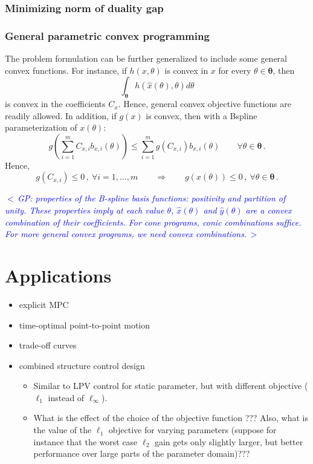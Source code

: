 \documentclass{article}
\newcommand{\commentGP}[1]{\noindent \textcolor{blue}{\emph{$<\,$GP: #1$\,>$}}}%
\newcommand{\ppar}{\theta}                          %
\newcommand{\Ppar}{{\bm{\theta}}}                   %
\begin{document}
\subsubsection{Minimizing norm of duality gap}


\subsubsection{General parametric convex programming}

The problem formulation can be further generalized to include some general convex functions. For instance, if $h(x,\ppar)$ is convex in $x$ for every $\ppar\in\Ppar$, then
\[ \int_{\Ppar} h(\hat{x}(\ppar), \ppar) d\ppar
\]
is convex in the coefficients $C_x$. Hence, general convex objective functions are readily allowed. In addition, if $g(x)$ is convex, then with a Bspline parameterization of $x(\ppar)$:
\[ g\left(\sum_{i=1}^m C_{x,i} b_{x,i}(\ppar)\right) \leq \sum_{i=1}^m g(C_{x,i}) b_{x,i}(\ppar) \qquad \forall \ppar\in\Ppar\,. %
\]
Hence,
\[ g(C_{x,i})\leq 0\,,~\forall i=1,\ldots,m \qquad \Rightarrow \qquad g(x(\ppar))\leq0\,,~\forall \ppar\in\Ppar\,.%
\]

\commentGP{properties of the B-spline basis functions: positivity and partition of unity. These properties imply at each value $\ppar$, $\hat{x}(\ppar)$ and $\hat{y}(\ppar)$ are a convex combination of their coefficients. For cone programs, conic combinations suffice. For more general convex programs, we need convex combinations.}



\section{Applications}

\begin{itemize}
\item explicit MPC
\item time-optimal point-to-point motion
\item trade-off curves
\item combined structure control design
    \begin{itemize}
    \item Similar to LPV control for static parameter, but with different objective ($\ell_1$ instead of $\ell_\infty$).
    \item What is the effect of the choice of the objective function ??? Also, what is the value of the $\ell_1$ objective for varying parameters (suppose for instance that the worst case $\ell_2$ gain gets only slightly larger, but better performance over large parts of the parameter domain)???
    \end{itemize}
\end{itemize}
\end{document}
